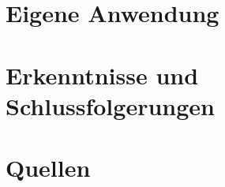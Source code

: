     \section{Eigene Anwendung}
    
    \section{Erkenntnisse und Schlussfolgerungen}
    
    \section{Quellen}
    
    
    
    



